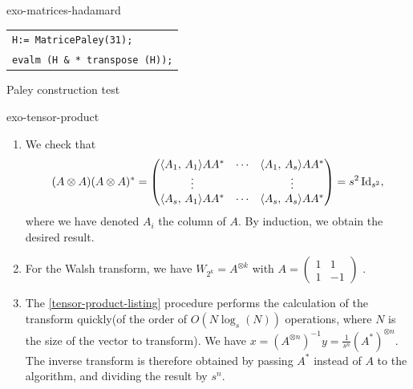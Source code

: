 \begin{correction}{exo-matrices-hadamard}
\begin{listing} \begin{footnotesize}
{\upshape
\begin{tabular}{l} \texttt{H:= MatricePaley(31);} \\
\texttt{evalm (H \& * transpose (H));} \\
\end{tabular}
}
\end{footnotesize}
\caption{Paley construction test}
\label{listing-testpaley}
\end{listing}
\end{correction}
 
 
\begin{correction}{exo-tensor-product}
\begin{enumerate}
\item We check that
\begin{equation*}
(A \otimes A) (A \otimes A)^* = \begin{pmatrix} \langle A_1,\,A_1\rangle AA^* & \cdots & \langle A_1,\,A_s\rangle AA^* \\\vdots & & \vdots \\\langle A_s,\,A_1\rangle AA^* & \cdots & \langle A_s,\,A_s\rangle AA^* \end{pmatrix} = s^2 \operatorname{Id}_{s^2},
\end{equation*}
where we have denoted $ A_i $ the  column of $ A $. By induction, we obtain the desired result.
\item For the Walsh transform, we have $ W_{2^k} = A^{\otimes k} $ with $ A = \begin{pmatrix} 1 & 1 \\1 & -1 \end{pmatrix} $ .
\item The \Matlab{} \ref{tensor-product-listing} procedure performs the calculation of the transform quickly(of the order of $ O(N \log_s (N)) $ operations, where $ N $ is the size of the vector to transform). We have $ x = (A^{\otimes n})^{-1} y = \frac{1}{s^n} (A^*)^{\otimes n} $. The inverse transform is therefore obtained by passing $ A^* $ instead of $ A $ to the algorithm, and dividing the result by $ s^n $.


\end{enumerate}
\end{correction}

